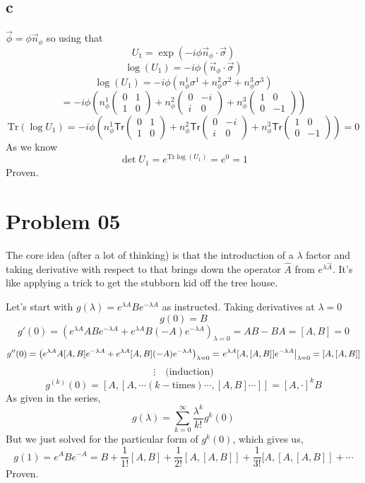 \documentclass[letter]{article}
\begin{document}
\subsection*{c} 
$\vec{\phi} = \phi \vec{n}_\phi$ so using that 
\[
U_1 = \exp(-i \phi \vec{n}_\phi \cdot \vec{\sigma}) 
\]
\[
\log(U_1) = -i \phi \left(\vec{n}_\phi \cdot \vec{\sigma}\right)
\]
\[
\log(U_1) = -i \phi (n^{1}_\phi \sigma^{1} + n^{2}_\phi \sigma^2 + n^{3}_\phi \sigma^3)
\]
\[
 = -i \phi
 \left(
	 n_\phi^{1} \begin{pmatrix} 0&1\\1&0 \end{pmatrix} +
	 n_\phi^{2} \begin{pmatrix} 0&-i\\i&0 \end{pmatrix} +
	 n_\phi^{3} \begin{pmatrix} 1&0\\0&-1 \end{pmatrix} 
 \right)
\]
\[
\text{Tr} (\log U_1) = 
-i \phi
 \left(
	 n_\phi^{1} \textsf{Tr} \begin{pmatrix} 0&1\\1&0 \end{pmatrix} +
	 n_\phi^{2} \textsf{Tr}\begin{pmatrix} 0&-i\\i&0 \end{pmatrix} +
	 n_\phi^{3} \textsf{Tr}\begin{pmatrix} 1&0\\0&-1 \end{pmatrix} 
 \right) = 0 
\]
As we know
\[
\det U_1 = e^{\text{Tr} \log(U_1) } = e^{0} = 1
\]
Proven. 


\newpage
\section*{Problem 05}
The core idea (after a lot of thinking) is that the introduction of a $\lambda$ factor and taking derivative with respect to that brings down the operator $\hat{A}$ from $e^{\lambda \hat{A}}$. It's like applying a trick to get the stubborn kid off the tree house. 

Let's start with $g(\lambda) = e^{\lambda A} B e^{- \lambda A}$ as instructed. Taking derivatives at $\lambda = 0$ 
\[
g(0) = B
\] 
\[
g'(0) = (e^{\lambda A} A B e^{-\lambda A} +
e^{\lambda A}B (-A) e^{- \lambda A} )_{\lambda = 0} = AB -BA = [A,B] = 0
\]
\[
g''(0) = \left( e^{\lambda A}A[A,B]e^{-\lambda A} + e^{\lambda A}[A,B](-A)e^{-\lambda A} \right)_{\lambda=0} = \left. e^{\lambda A}[A,[A,B]]e^{-\lambda A}\right|_{\lambda=0} = [A,[A,B]] \\
\]
\[
\vdots \quad \text{(induction)}\]
\[
g^{(k)}(0) = [A,[A,\cdots(k-\text{times})\cdots,[A,B]\cdots]] = [A,\cdot]^k B
\] 
As given in the series, 
\[
g(\lambda) = \sum_{k = 0}^{\infty} \frac{\lambda^{k}}{k!} g^{k} (0) 
\]
But we just solved for the particular form of $g^{k} (0)$, which gives us,
\[
	g(1) = e^{A} B e^{-A} = B + \frac{1}{1!} [A,B] + \frac{1}{2!} [A, [A,B]] + \frac{1}{3!} [A, [A,[A,B]] + \cdots
\] 
Proven. 
\end{document}
